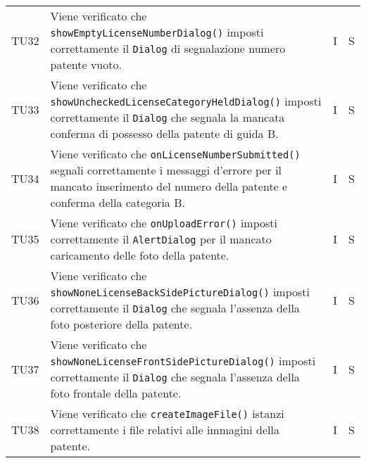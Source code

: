 \begin{longtable}{ >{\centering}p{}  >{\centering}p{} >{\centering}p{}
			>{\centering}p{}}
		\tabularnewline	
		TU32 & Viene verificato che \texttt{showEmptyLicenseNumberDialog()} imposti correttamente il \texttt{Dialog} di segnalazione numero patente vuoto. & I & S
		\tabularnewline	
		TU33 & Viene verificato che \texttt{showUncheckedLicenseCategoryHeldDialog()} imposti correttamente il \texttt{Dialog} che segnala la mancata conferma di possesso della patente di guida B. & I & S
		\tabularnewline	
		TU34 & Viene verificato che \texttt{onLicenseNumberSubmitted()} segnali correttamente i messaggi d'errore per il mancato inserimento del numero della patente e conferma della categoria B. & I & S
		\tabularnewline	
		TU35 & Viene verificato che \texttt{onUploadError()} imposti correttamente il \texttt{AlertDialog} per il mancato caricamento delle foto della patente. & I & S
		\tabularnewline	
		TU36 & Viene verificato che \texttt{showNoneLicenseBackSidePictureDialog()} imposti correttamente il \texttt{Dialog} che segnala l'assenza della foto posteriore della patente. & I & S
		\tabularnewline	
		TU37 & Viene verificato che \texttt{showNoneLicenseFrontSidePictureDialog()} imposti correttamente il \texttt{Dialog} che segnala l'assenza della foto frontale della patente. & I & S
		\tabularnewline	
		TU38 & Viene verificato che \texttt{createImageFile()} istanzi correttamente i file relativi alle immagini della patente. & I & S \tabularnewline	
		

\end{longtable}
